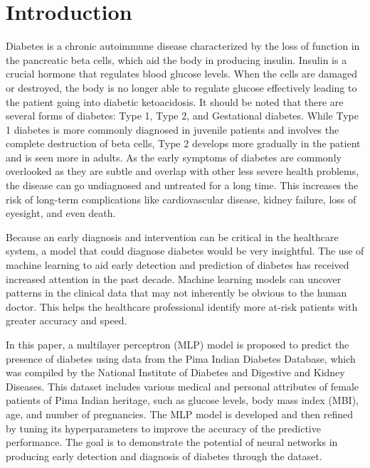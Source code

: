 \section{Introduction}

Diabetes is a chronic autoimmune disease characterized by the loss of function in the pancreatic beta cells, which aid the body in producing insulin. Insulin is a crucial hormone that regulates blood glucose levels. When the cells are damaged or destroyed, the body is no longer able to regulate glucose effectively leading to the patient going into diabetic ketoacidosis.  It should be noted that there are several forms of diabetes: Type 1, Type 2, and Gestational diabetes. While Type 1 diabetes is more commonly diagnosed in juvenile patients and involves the complete destruction of beta cells, Type 2 develops more gradually in the patient and is seen more in adults. As the early symptoms of diabetes are commonly overlooked as they are subtle and overlap with other less severe health problems, the disease can go undiagnosed and untreated for a long time. This increases the risk of long-term complications like cardiovascular disease, kidney failure, loss of eyesight, and even death. 

Because an early diagnosis and intervention can be critical in the healthcare system, a model that could diagnose diabetes would be very insightful. The use of machine learning to aid early detection and prediction of diabetes has received increased attention in the past decade. Machine learning models can uncover patterns in the clinical data that may not inherently be obvious to the human doctor. This helps the healthcare professional identify more at-risk patients with greater accuracy and speed. 

In this paper, a multilayer perceptron (MLP) model is proposed to predict the presence of diabetes using data from the Pima Indian Diabetes Database, which was compiled by the National Institute of Diabetes and Digestive and Kidney Diseases. This dataset includes various medical and personal attributes of female patients of Pima Indian heritage, such as glucose levels, body mass index (MBI), age, and number of pregnancies. The MLP model is developed and then refined by tuning its hyperparameters to improve the accuracy of the predictive performance. The goal is to demonstrate the potential of neural networks in producing early detection and diagnosis of diabetes through the dataset. 


